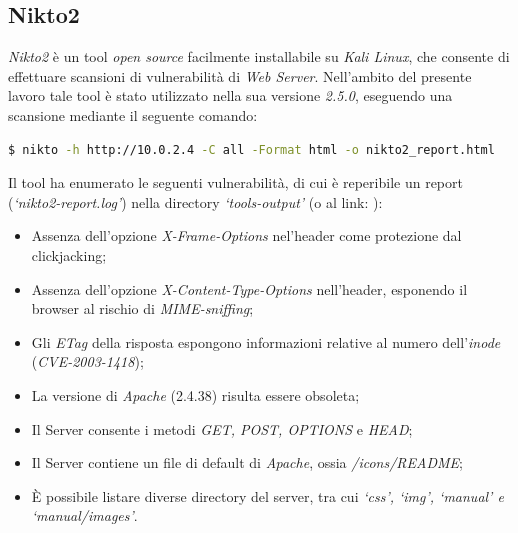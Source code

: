 \subsection{Nikto2}
\emph{Nikto2} è un tool \emph{open source} facilmente installabile su \emph{Kali Linux}, che consente di effettuare scansioni di vulnerabilità di \emph{Web Server}. Nell'ambito del presente lavoro tale tool è stato utilizzato nella sua versione \emph{2.5.0}, eseguendo una scansione mediante il seguente comando:
\begin{lstlisting}[language=bash]
    $ nikto -h http://10.0.2.4 -C all -Format html -o nikto2_report.html
\end{lstlisting}
Il tool ha enumerato le seguenti vulnerabilità, di cui è reperibile un report (\emph{`nikto2-report.log'}) nella directory \emph{`tools-output'} (o al link: ):
\begin{itemize}
    \item Assenza dell'opzione \emph{X-Frame-Options} nel'header come protezione dal clickjacking;
    \item Assenza dell'opzione \emph{X-Content-Type-Options} nell'header, esponendo il browser al rischio di \emph{MIME-sniffing};
    \item Gli \emph{ETag} della risposta espongono informazioni relative al numero dell'\emph{inode} (\emph{CVE-2003-1418});
    \item La versione di \emph{Apache} (2.4.38) risulta essere obsoleta;
    \item Il Server consente i metodi \emph{GET, POST, OPTIONS} e \emph{HEAD};
    \item Il Server contiene un file di default di \emph{Apache}, ossia \emph{/icons/README};
    \item È possibile listare diverse directory del server, tra cui \emph{`css', `img', `manual' e `manual/images'}.
\end{itemize}
